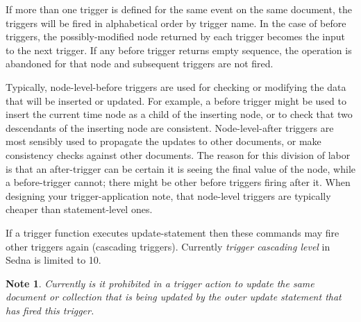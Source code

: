 \documentclass[a4paper,12pt]{article}
\newtheorem{note}{Note}    %
\begin{document}
If more than one trigger is defined for the same event on the same document, the
triggers will be fired in alphabetical order by trigger name. In the case of
before triggers, the possibly-modified node returned by each trigger becomes the
input to the next trigger. If any before trigger returns empty sequence, the
operation is abandoned for that node and subsequent triggers are not fired.

Typically, node-level-before triggers are used for checking or modifying the
data that will be inserted or updated. For example, a before trigger might be
used to insert the current time node as a child of the inserting node, or to
check that two descendants of the inserting node are consistent.
Node-level-after triggers are most sensibly used to propagate the updates to
other documents, or make consistency checks against other documents. The reason
for this division of labor is that an after-trigger can be certain it is seeing
the final value of the node, while a before-trigger cannot; there might be other
before triggers firing after it. When designing your trigger-application note,
that node-level triggers are typically cheaper than statement-level ones.

If a trigger function executes update-statement then these commands may fire
other triggers again (cascading triggers). Currently \emph{trigger cascading
level} in Sedna is limited to 10.

\begin{note}
Currently is it prohibited in a trigger action to update the same document or
collection that is being updated by the outer update statement that has fired
this trigger.
\end{note}
\end{document}
